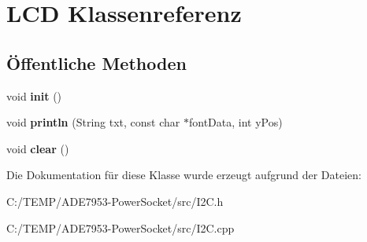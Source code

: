 \hypertarget{class_l_c_d}{}\section{L\+CD Klassenreferenz}
\label{class_l_c_d}
\subsection*{Öffentliche Methoden}
\begin{DoxyCompactItemize}
\item 
\mbox{\label{class_l_c_d_a1c9a188830514801292eb9972ef5ef36}} 
void {\bfseries init} ()
\item 
\mbox{\label{class_l_c_d_a7514ab03fc96435731dccf816f90f460}} 
void {\bfseries println} (String txt, const char $\ast$font\+Data, int y\+Pos)
\item 
\mbox{\label{class_l_c_d_afa699e0beeeee03cce8cef87eba81c4a}} 
void {\bfseries clear} ()
\end{DoxyCompactItemize}


Die Dokumentation für diese Klasse wurde erzeugt aufgrund der Dateien\+:\begin{DoxyCompactItemize}
\item 
C\+:/\+T\+E\+M\+P/\+A\+D\+E7953-\/\+Power\+Socket/src/I2\+C.\+h\item 
C\+:/\+T\+E\+M\+P/\+A\+D\+E7953-\/\+Power\+Socket/src/I2\+C.\+cpp\end{DoxyCompactItemize}
